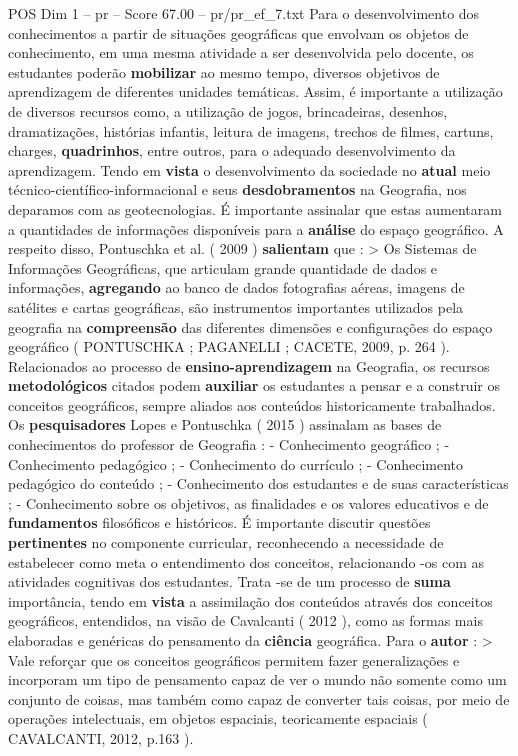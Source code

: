 \begin{textsample}{POS Dim 1 – pr – Score 67.00 – pr/pr\_ef\_7.txt}
Para o desenvolvimento dos conhecimentos a partir de situações geográficas que envolvam os objetos de conhecimento, em uma mesma atividade a ser desenvolvida pelo docente, os estudantes poderão \textbf{mobilizar} ao mesmo tempo, diversos objetivos de aprendizagem de diferentes unidades temáticas.
Assim, é importante a utilização de diversos recursos como, a utilização de jogos, brincadeiras, desenhos, dramatizações, histórias infantis, leitura de imagens, trechos de filmes, cartuns, charges, \textbf{quadrinhos}, entre outros, para o adequado desenvolvimento da aprendizagem.
Tendo em \textbf{vista} o desenvolvimento da sociedade no \textbf{atual} meio técnico-científico-informacional e seus \textbf{desdobramentos} na Geografia, nos deparamos com as geotecnologias.
É importante assinalar que estas aumentaram a quantidades de informações disponíveis para a \textbf{análise} do espaço geográfico.
A respeito disso, Pontuschka et al. ( 2009 ) \textbf{salientam} que : > Os Sistemas de Informações Geográficas, que articulam grande quantidade de dados e informações, \textbf{agregando} ao banco de dados fotografias aéreas, imagens de satélites e cartas geográficas, são instrumentos importantes utilizados pela geografia na \textbf{compreensão} das diferentes dimensões e configurações do espaço geográfico ( PONTUSCHKA ; PAGANELLI ; CACETE, 2009, p. 264 ).
Relacionados ao processo de \textbf{ensino-aprendizagem} na Geografia, os recursos \textbf{metodológicos} citados podem \textbf{auxiliar} os estudantes a pensar e a construir os conceitos geográficos, sempre aliados aos conteúdos historicamente trabalhados.
Os \textbf{pesquisadores} Lopes e Pontuschka ( 2015 ) assinalam as bases de conhecimentos do professor de Geografia : - Conhecimento geográfico ; - Conhecimento pedagógico ; - Conhecimento do currículo ; - Conhecimento pedagógico do conteúdo ; - Conhecimento dos estudantes e de suas características ; - Conhecimento sobre os objetivos, as finalidades e os valores educativos e de \textbf{fundamentos} filosóficos e históricos.
É importante discutir questões \textbf{pertinentes} no componente curricular, reconhecendo a necessidade de estabelecer como meta o entendimento dos conceitos, relacionando -os com as atividades cognitivas dos estudantes.
Trata -se de um processo de \textbf{suma} importância, tendo em \textbf{vista} a assimilação dos conteúdos através dos conceitos geográficos, entendidos, na visão de Cavalcanti ( 2012 ), como as formas mais elaboradas e genéricas do pensamento da \textbf{ciência} geográfica.
Para o \textbf{autor} : > Vale reforçar que os conceitos geográficos permitem fazer generalizações e incorporam um tipo de pensamento capaz de ver o mundo não somente como um conjunto de coisas, mas também como capaz de converter tais coisas, por meio de operações intelectuais, em objetos espaciais, teoricamente espaciais ( CAVALCANTI, 2012, p.163 ).

\end{textsample}
